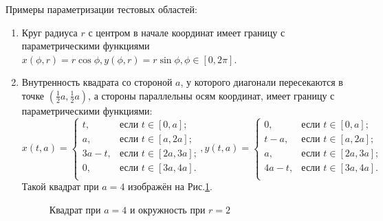 \documentclass[a4paper, 12pt]{article}
\begin{document}
Примеры параметризации тестовых областей:
\begin{enumerate}
    \item Круг радиуса $r$ с центром в начале координат имеет границу с параметрическими функциями $x(\phi, r)=r \cos \phi, y(\phi, r)=r \sin \phi, \phi \in [0, 2\pi]$. 
     \item Внутренность квадрата со стороной $a$, у которого диагонали пересекаются в точке $(\frac{1}{2}a,\frac{1}{2}a)$, а стороны параллельны осям координат, имеет границу с параметрическими функциями:
     \[
x(t,a) =
\begin{cases}
t, & \text{если $t \in [0,a]$;} \\
a, & \text{если $t \in [a,2a]$;} \\
3a-t, & \text{если $t \in [2a,3a]$;} \\
0, & \text{если $t \in [3a,4a]$.} \\
\end{cases},
y(t,a) =
\begin{cases}
0, & \text{если $t \in [0,a]$;} \\
t-a, & \text{если $t \in [a,2a]$;} \\
a, & \text{если $t \in [2a,3a]$;} \\
4a-t, & \text{если $t \in [3a,4a]$.} \\
\end{cases}
\]
Такой квадрат при $a=4$ изображён на Рис.\ref{kvci}.
\begin{figure}[h!]
    \noindent{}
    \caption{Квадрат при $a=4$ и окружность при $r=2$}
    \label{kvci}
    \end{figure} 


\end{enumerate}
\end{document}
